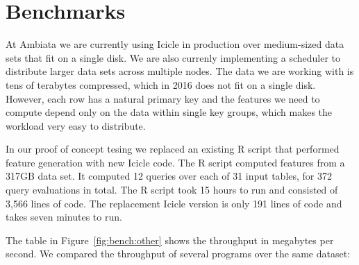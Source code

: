 \section{Benchmarks}
\label{s:Benchmarks}


At Ambiata we are currently using Icicle in production over medium-sized data sets that fit on a single disk. We are also currenly implementing a scheduler to distribute larger data sets across multiple nodes. The data we are working with is tens of terabytes compressed, which in 2016 does not fit on a single disk. However, each row has a natural primary key and the features we need to compute depend only on the data within single key groups, which makes the workload very easy to distribute.


In our proof of concept tesing we replaced an existing R script that performed feature generation with new Icicle code. The R script computed features from a 317GB data set. It computed 12 queries over each of 31 input tables, for 372 query evaluations in total. The R script took 15 hours to run and consisted of 3,566 lines of code. The replacement Icicle version is only 191 lines of code and takes seven minutes to run.

The table in Figure~\ref{fig:bench:other} shows the throughput in megabytes per second.
We compared the throughput of several programs over the same dataset:

